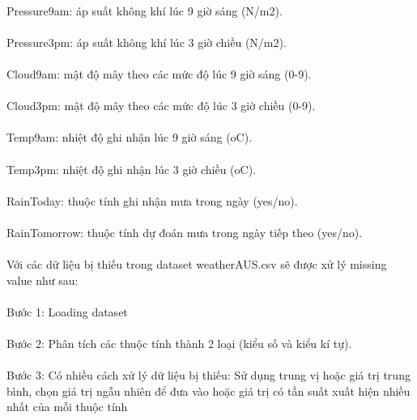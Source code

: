 \documentclass{article}
\begin{document}
\paragraph{} Pressure9am: áp suất không khí lúc 9 giờ sáng (N/m2).
\paragraph{} Pressure3pm: áp suất không khí lúc 3 giờ chiều (N/m2).
\paragraph{} Cloud9am: mật độ mây theo các mức độ lúc 9 giờ sáng (0-9).
\paragraph{} Cloud3pm: mật độ mây theo các mức độ lúc 3 giờ chiều (0-9).
\paragraph{} Temp9am: nhiệt độ ghi nhận lúc 9 giờ sáng (oC).
\paragraph{} Temp3pm: nhiệt độ ghi nhận lúc 3 giờ chiều (oC).
\paragraph{} RainToday: thuộc tính ghi nhận mưa trong ngày (yes/no).
\paragraph{} RainTomorrow: thuộc tính dự đoán mưa trong ngày tiếp theo (yes/no).
\paragraph{} Với các dữ liệu bị thiếu trong dataset weatherAUS.csv sẽ được xử lý missing value như sau:
\paragraph{}Bước 1: Loading dataset
\paragraph{}Bước 2: Phân tích các thuộc tính thành 2 loại (kiểu số và kiểu kí tự).
\paragraph{}Bước 3: Có nhiều cách xử lý dữ liệu bị thiếu: Sử dụng trung vị hoặc giá trị trung bình, chọn giá trị ngẫu nhiên để đưa vào hoặc giá trị có tần suất xuất hiện nhiều nhất của mỗi thuộc tính
\end{document}
